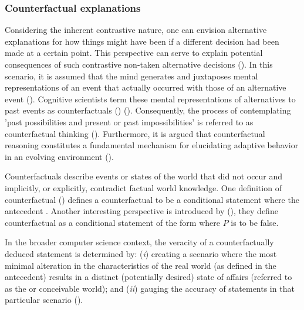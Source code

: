 \documentclass[binding=0.6cm]{sapthesis}
\newcommand{\mycite}[1]{(\cite{#1})}
\begin{document}
\subsubsection{Counterfactual explanations}
\label{sec:bg.xai.counterfactual}
Considering the inherent contrastive nature, one can envision alternative explanations for how things might have been if a different decision had been made at a certain point. This perspective can serve to explain potential consequences of such contrastive non-taken alternative decisions \mycite{stepin2021-xai-cf-contrative-survey}. In this scenario, it is assumed that the mind generates and juxtaposes mental representations of an event that actually occurred with those of an alternative event \mycite{byrne2015-cf-thought}. Cognitive scientists term these mental representations of alternatives to past events as counterfactuals () \mycite{roese1997-cf-thinking}. Consequently, the process of contemplating 'past possibilities and present or past impossibilities' is referred to as counterfactual thinking \mycite{byrne1997-cognitivePI}. Furthermore, it is argued that counterfactual reasoning constitutes a fundamental mechanism for elucidating adaptive behavior in an evolving environment \mycite{paik2014-cf-reason-key,zhou2015-learning,zhang2015-reinforcement}.

Counterfactuals describe events or states of the world that did not occur and implicitly, or explicitly, contradict factual world knowledge. One definition of counterfactual \mycite{grahne1991-updates-and-cf} defines a counterfactual to be a conditional statement where the antecedent . Another interesting perspective is introduced by \mycite{ginsberg1986-counterfactuals}, they define counterfactual as a conditional statement of the form  where $P$ is  to be false.

In the broader computer science context, the veracity of a counterfactually deduced statement is determined by: (\textit{i}) creating a scenario where the most minimal alteration in the characteristics of the real world (as defined in the antecedent) results in a distinct (potentially desired) state of affairs (referred to as the  or  conceivable world); and (\textit{ii}) gauging the accuracy of statements in that particular scenario \mycite{lewis1989-plurality-worlds}.

\end{document}
